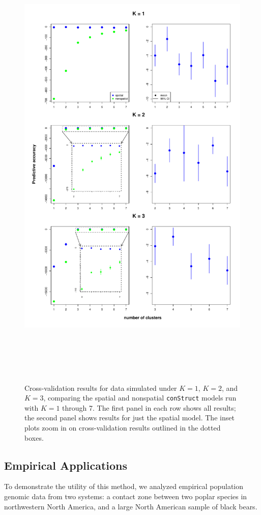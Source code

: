 \documentclass[12pt]{article}
\begin{document}
\begin{figure}
	\centering
		{\includegraphics[width=6in,height=8.5in]{figs/sims/xvals.pdf}}
	\caption{
	Cross-validation results for data simulated under $K=1$, $K=2$, and $K=3$, 
	comparing the spatial and nonspatial \texttt{conStruct} models run with $K=1$ through 7.  
	The first panel in each row shows all results; 
	the second panel shows results for just the spatial model.
	The inset plots zoom in on cross-validation results outlined in the dotted boxes.
    }\label{xvals}
\end{figure}

\subsection*{Empirical Applications}
To demonstrate the utility of this method, we analyzed empirical population genomic data from two systems:
a contact zone between two poplar species in northwestern North America,
and a large North American sample of black bears.
\end{document}

